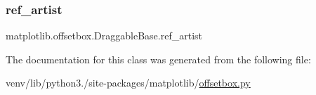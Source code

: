 \mbox{\label{classmatplotlib_1_1offsetbox_1_1DraggableBase_aee9675f921b3b97a1b75e20fc11bf8ba}} 
\subsubsection{\texorpdfstring{ref\+\_\+artist}{ref\_artist}}
{\footnotesize\ttfamily matplotlib.\+offsetbox.\+Draggable\+Base.\+ref\+\_\+artist}



The documentation for this class was generated from the following file\+:\begin{DoxyCompactItemize}
\item 
venv/lib/python3./site-\/packages/matplotlib/\hyperlink{offsetbox_8py}{offsetbox.\+py}\end{DoxyCompactItemize}
